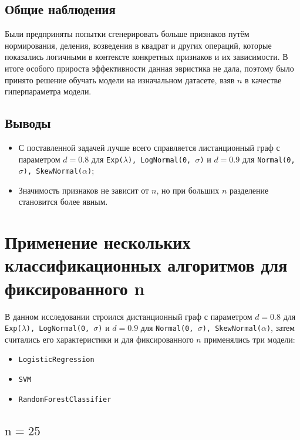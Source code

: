 \documentclass[12pt,a4paper]{report}
\begin{document}
\subsection{Общие наблюдения}
Были предприняты попытки сгенерировать больше признаков путём нормирования, деления, возведения в квадрат и других операций, которые показались логичными в контексте конкретных признаков и их зависимости. В итоге особого прироста эффективности данная эвристика не дала, поэтому было принято решение обучать модели на изначальном датасете, взяв $n$ в качестве гиперпараметра модели.

\subsection{Выводы}
\begin{itemize}
    \item С поставленной задачей лучше всего справляется листанционный граф с параметром $d = 0.8$ для \texttt{Exp($\lambda$), LogNormal(0, $\sigma$)} и $d = 0.9$ для \texttt{Normal(0, $\sigma$), SkewNormal($\alpha$)};
    \item Значимость признаков не зависит от $n$, но при больших $n$ разделение становится более явным.
\end{itemize}

\section{Применение нескольких классификационных алгоритмов для фиксированного n}

В данном исследовании строился дистанционный граф с параметром $d = 0.8$ для \texttt{Exp($\lambda$), LogNormal(0, $\sigma$)} и $d = 0.9$ для \texttt{Normal(0, $\sigma$), SkewNormal($\alpha$)}, затем считались его характеристики и для фиксированного $n$ применялись три модели:
\begin{itemize}
    \item \texttt{LogisticRegression}
    \item \texttt{SVM}
    \item \texttt{RandomForestClassifier}
\end{itemize}

\subsection{$\text{n} = 25$}
\end{document}
